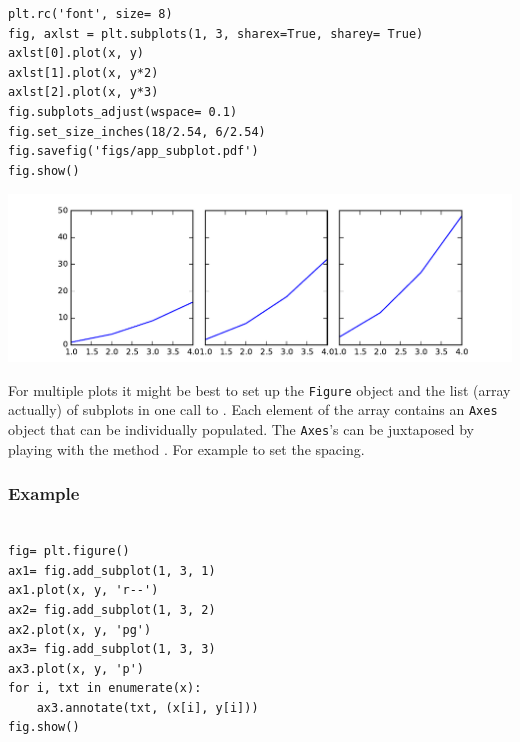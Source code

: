 \begin{verbatim}
plt.rc('font', size= 8)
fig, axlst = plt.subplots(1, 3, sharex=True, sharey= True)
axlst[0].plot(x, y)
axlst[1].plot(x, y*2)
axlst[2].plot(x, y*3)
fig.subplots_adjust(wspace= 0.1)
fig.set_size_inches(18/2.54, 6/2.54)
fig.savefig('figs/app_subplot.pdf')
fig.show()
\end{verbatim}

\includegraphics[width=\linewidth]{figs/app_subplot.pdf}

For multiple plots it might be best to set up the \texttt{Figure} object and the
list (array actually) of subplots in one call to . Each element
of the array contains an \texttt{Axes} object that can be individually populated.
The \texttt{Axes}'s can be juxtaposed by playing with the method .
For example to set the spacing. 

\subsubsection{Example}

\begin{verbatim}

fig= plt.figure()
ax1= fig.add_subplot(1, 3, 1)
ax1.plot(x, y, 'r--')
ax2= fig.add_subplot(1, 3, 2)
ax2.plot(x, y, 'pg')
ax3= fig.add_subplot(1, 3, 3)
ax3.plot(x, y, 'p')
for i, txt in enumerate(x):
    ax3.annotate(txt, (x[i], y[i]))
fig.show()
\end{verbatim}